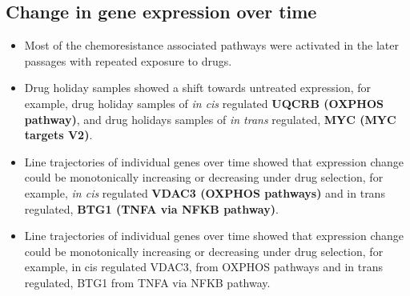 \subsection{Change in gene expression over time}

\begin{itemize}
 \item Most of the chemoresistance associated pathways were activated in the later passages with repeated exposure to drugs.
 
 \item Drug holiday samples showed a shift towards untreated expression, for example, drug holiday samples of \textit{in cis} regulated \textbf{UQCRB (OXPHOS pathway)},  and drug holidays samples of \textit{in trans} regulated, \textbf{MYC (MYC targets V2)}.
 \item Line trajectories of individual genes over time showed that expression change could be monotonically increasing or decreasing under drug selection, for example, \textit{in cis} regulated \textbf{VDAC3  (OXPHOS pathways)} and in trans regulated, \textbf{BTG1 (TNFA via NFKB pathway)}.

 \item Line trajectories of individual genes over time showed that expression change could be monotonically increasing or decreasing under drug selection, for example, in cis regulated VDAC3, from OXPHOS pathways and in trans regulated, BTG1 from TNFA via NFKB pathway.

\end{itemize}

